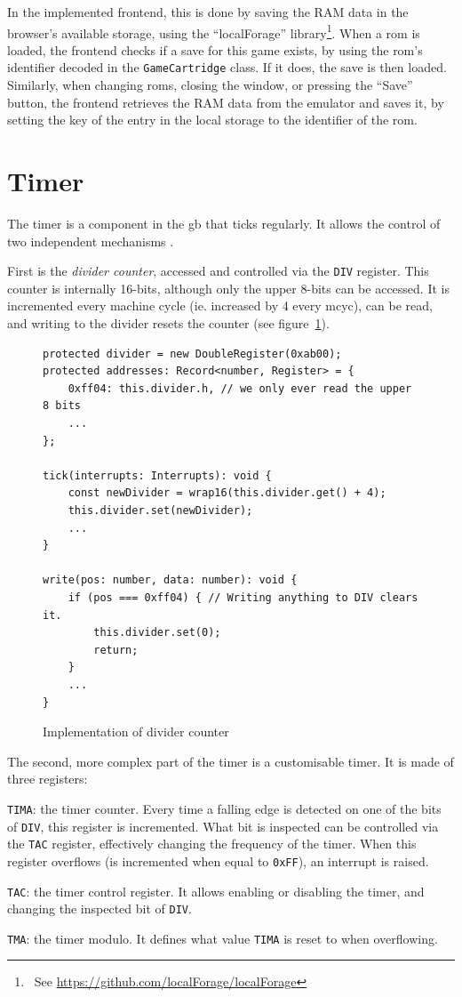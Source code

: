 \documentclass[11pt]{report}
\newcommand{\ftnt}[1]{\footnote{~See \url{#1}}}
\begin{document}
In the implemented frontend, this is done by saving the RAM data in the browser's available storage, using the ``localForage'' library\ftnt{https://github.com/localForage/localForage}. When a \gls{rom} is loaded, the frontend checks if a save for this game exists, by using the \gls{rom}'s identifier decoded in the \texttt{GameCartridge} class. If it does, the save is then loaded. Similarly, when changing \glspl{rom}, closing the window, or pressing the ``Save'' button, the frontend retrieves the RAM data from the emulator and saves it, by setting the key of the entry in the local storage to the identifier of the \gls{rom}.

\section{Timer}

The timer is a component in the \gls{gb} that ticks regularly. It allows the control of two independent mechanisms \cite[Timer and Divider Registers]{pandoc}.

First is the \textit{divider counter}, accessed and controlled via the \texttt{DIV} register. This counter is internally 16-bits, although only the upper 8-bits can be accessed. It is incremented every machine cycle (ie. increased by 4 every \gls{mcyc}), can be read, and writing to the divider resets the counter (see figure~\ref{fig:div-timer}).

\begin{figure}[h]
    \begin{verbatim}
protected divider = new DoubleRegister(0xab00);
protected addresses: Record<number, Register> = {
	0xff04: this.divider.h, // we only ever read the upper 8 bits
	...
};

tick(interrupts: Interrupts): void {
	const newDivider = wrap16(this.divider.get() + 4);
	this.divider.set(newDivider);
	...
}

write(pos: number, data: number): void {
    if (pos === 0xff04) { // Writing anything to DIV clears it.
        this.divider.set(0);
        return;
    }
    ...
}
    \end{verbatim}
    \caption{Implementation of divider counter}
    \label{fig:div-timer}
\end{figure}

The second, more complex part of the timer is a customisable timer. It is made of three registers:
\begin{compactitem}
	\item \texttt{TIMA}: the timer counter.  Every time a falling edge is detected on one of the bits of \texttt{DIV}, this register is incremented. What bit is inspected can be controlled via the \texttt{TAC} register, effectively changing the frequency of the timer. When this register overflows (is incremented when equal to \texttt{0xFF}), an interrupt is raised.
	\item \texttt{TAC}: the timer control register. It allows enabling or disabling the timer, and changing the inspected bit of \texttt{DIV}.
	\item \texttt{TMA}: the timer modulo. It defines what value \texttt{TIMA} is reset to when overflowing.
\end{compactitem}
\end{document}
